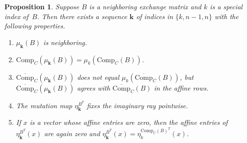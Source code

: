 \documentclass{amsart}
\newtheorem{proposition}{Proposition}[section]
\theoremstyle{definition}
\theoremstyle{remark}
\numberwithin{equation}{section}
\newcommand{\reals}{\mathbb R}
\newcommand{\set}[1]{{\lbrace #1 \rbrace}}
\newcommand{\0}{{\mathbf{0}}}
\newcommand{\Comp}{\mathrm{Comp}_C}
\newcommand{\CompPlus}{\overline{\mathrm{Comp}}_C}
\newcommand{\kk}{{\boldsymbol{k}}}
\begin{document}
\begin{proposition}\label{special mut}
Suppose $B$ is a neighboring exchange matrix and $k$ is a special index of~$B$.
Then there exists a sequence $\kk$ of indices in $\set{k,n-1,n}$ with the following properties.
\begin{enumerate}[label=\bf\arabic*., ref=\arabic*]
\item
$\mu_\kk(B)$ is neighboring.
\item
$\Comp(\mu_\kk(B))=\mu_k(\Comp(B))$.
\item
$\CompPlus(\mu_\kk(B))$ does not equal $\mu_k(\CompPlus(B))$, but $\CompPlus(\mu_\kk(B))$ agrees with $\CompPlus(B)$ in the affine rows.
\item
The mutation map $\eta^{B^T}_\kk$ fixes the imaginary ray pointwise.
\item
If $x$ is a vector whose affine entries are zero, then the affine entries of $\eta^{B^T}_\kk(x)$ are again zero and $\eta^{B^T}_\kk(x)=\eta^{\Comp(B)^T}_k(x)$.
\end{enumerate}
\end{proposition}
\end{document}
